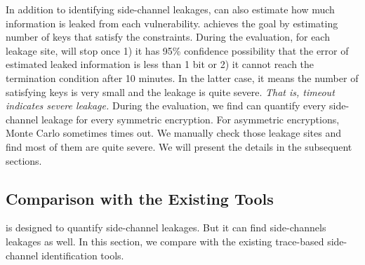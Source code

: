 In addition to identifying side-channel leakages, \tool{} can also estimate how
much information is leaked from each vulnerability. \tool{} achieves the goal by
estimating number of keys that satisfy the constraints. During the evaluation,
for each leakage site, \tool{} will stop once 1) it has 95\% confidence
possibility that the error of estimated leaked information is less than 1 bit or
2) it cannot reach the termination condition after 10 minutes. In the latter
case, it means the number of satisfying keys is very small and the leakage is
quite severe. \emph{That is, timeout indicates severe leakage.}
\label{loc:timeout}
During the evaluation,
we find \tool{} can quantify every side-channel leakage for every symmetric
encryption. For asymmetric encryptions, Monte Carlo sometimes
times out. We manually check those leakage sites and find most of them are quite severe.
We will present the details in the subsequent sections.

\subsection{Comparison with the Existing Tools}
\label{eval:scala}


\tool{} is designed to quantify side-channel leakages. But it can find
side-channels leakages as well. In this section, we compare \tool{} with the
existing trace-based side-channel identification tools. 

